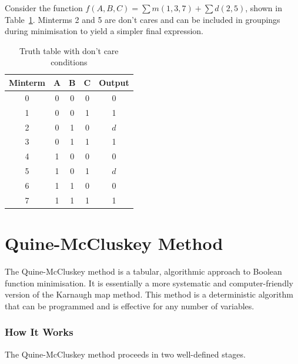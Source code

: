 Consider the function \(f(A,B,C) = \sum m(1,3,7) + \sum d(2,5)\), shown
in Table~\ref{tab:dontcare}. Minterms 2 and 5 are don't cares and can be
included in groupings during minimisation to yield a simpler final
expression.

\begin{table}[h!]
\centering
\caption{Truth table with don't care conditions}
\label{tab:dontcare}
\begin{tabular}{@{}ccccc@{}}
\toprule
\textbf{Minterm} & \textbf{A} & \textbf{B} & \textbf{C} &
\textbf{Output} \\
\midrule
0 & 0 & 0 & 0 & 0 \\
1 & 0 & 0 & 1 & 1 \\
2 & 0 & 1 & 0 & \(d\) \\
3 & 0 & 1 & 1 & 1 \\
4 & 1 & 0 & 0 & 0 \\
5 & 1 & 0 & 1 & \(d\) \\
6 & 1 & 1 & 0 & 0 \\
7 & 1 & 1 & 1 & 1 \\
\bottomrule
\end{tabular}
\end{table}

\section{Quine-McCluskey Method}

\begin{definition}
The Quine-McCluskey method is a tabular, algorithmic approach to Boolean
function minimisation. It is essentially a more systematic and
computer-friendly version of the Karnaugh map method. This method is a
deterministic algorithm that can be programmed and is effective for any
number of variables.
\end{definition}

\subsubsection{How It Works}

The Quine-McCluskey method proceeds in two well-defined stages.

